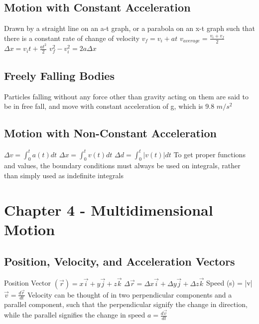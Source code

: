 \documentclass[11 pt, twoside]{article}
\newenvironment{outline*}
{
	\begin{outline}[enumerate]
	}
	{\end{outline}
}
\begin{document}
\subsection{Motion with Constant Acceleration}
\begin{outline*}
\1 Drawn by a straight line on an a-t graph, or a parabola on an x-t graph such that there is a constant rate of change of velocity
\1 $v_f = v_i + at$
\1 $v_{average} = \frac{v_i + v_f}{2}$
\1 $\Delta x = v_it + \frac{at^2}{2}$
\1 $v_f^2 - v_i^2 = 2a\Delta x$
\end{outline*}
\subsection{Freely Falling Bodies}
\begin{outline*}
\1 Particles falling without any force other than gravity acting on them are said to be in free fall, and move with constant acceleration of g, which is 9.8 $m/s^2$
\end{outline*}
\subsection{Motion with Non-Constant Acceleration}
\begin{outline*}
\1 $\Delta v = \int_0^t a(t)dt$
\1 $\Delta x = \int_0^t v(t)dt$
\1 $\Delta d = \int_0^t |v(t)|dt$
\1 To get proper functions and values, the boundary conditions must always be used on integrals, rather than simply used as indefinite integrals
\end{outline*}
\section{Chapter 4 - Multidimensional Motion}
\subsection{Position, Velocity, and Acceleration Vectors}
\begin{outline*}
\1 Position Vector $(\vec{r}) = x\vec{i} + y\vec{j} + z\vec{k}$
\1 $\Delta \vec{r} = \Delta x\vec{i} + \Delta y\vec{j} + \Delta z\vec{k}$
\1 Speed (s) = |v|
\1 $\vec{v} = \frac{d\vec{r}}{dt}$
\1 Velocity can be thought of in two perpendicular components and a parallel component, such that the perpendicular signify the change in direction, while the parallel signifies the change in speed
\1 $a = \frac{d\vec{v}}{dt}$
\end{outline*}
\end{document}
